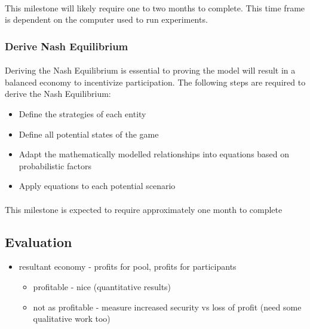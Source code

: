 \paragraph{} This milestone will likely require one to two months to complete. This time frame is dependent on the computer used to run experiments.

\subsubsection{Derive Nash Equilibrium}

\paragraph{} Deriving the Nash Equilibrium is essential to proving the model will result in a balanced economy to incentivize participation. The following steps are required to derive the Nash Equilibrium:

\begin{itemize}
  \item Define the strategies of each entity
  \item Define all potential states of the game
  \item Adapt the mathematically modelled relationships into equations based on probabilistic factors
  \item Apply equations to each potential scenario
\end{itemize}

\paragraph{} This milestone is expected to require approximately one month to complete

\subsection{Evaluation}

\begin{itemize}
  \item resultant economy - profits for pool, profits for participants
    \begin{itemize}
      \item profitable - nice (quantitative results)
      \item not as profitable - measure increased security vs loss of profit (need some qualitative work too)
    \end{itemize}
\end{itemize}

